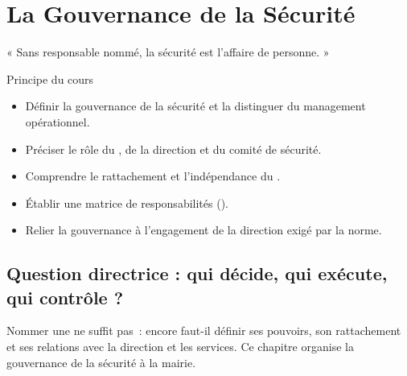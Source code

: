 
\chapter{La Gouvernance de la Sécurité}
\label{chap:gouvernance}

\epigraph{%
    « Sans responsable nommé, la sécurité est l'affaire de personne. »%
}{Principe du cours}


\begin{boxobjectifs}
\begin{itemize}
    \item Définir la gouvernance de la sécurité et la distinguer du management
          opérationnel.
    \item Préciser le rôle du , de la direction et du comité de
          sécurité.
    \item Comprendre le rattachement et l'indépendance du .
    \item Établir une matrice de responsabilités ().
    \item Relier la gouvernance à l'engagement de la direction exigé par la
          norme.
\end{itemize}
\end{boxobjectifs}

\bigskip

\section*{Question directrice : qui décide, qui exécute, qui contrôle ?}

Nommer une  ne suffit pas~: encore faut-il définir ses pouvoirs,
son rattachement et ses relations avec la direction et les services. Ce
chapitre organise la gouvernance de la sécurité à la mairie.

